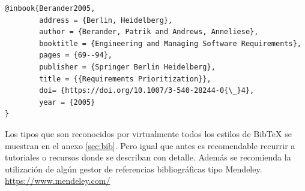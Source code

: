  \begin{verbatim}
@inbook{Berander2005,
        address = {Berlin, Heidelberg},
        author = {Berander, Patrik and Andrews, Anneliese},
        booktitle = {Engineering and Managing Software Requirements},
        pages = {69--94},
        publisher = {Springer Berlin Heidelberg},
        title = {{Requirements Prioritization}},
        doi= {https://doi.org/10.1007/3-540-28244-0{\_}4},
        year = {2005}
} 
 \end{verbatim}
 
 Los tipos que son reconocidos por virtualmente todos los estilos de BibTeX se muestran en el anexo \ref{sec:bib}. Pero igual que antes es recomendable recurrir a tutoriales o recursos donde se describan con detalle. Además se recomienda la utilización de algún gestor de referencias bibliográficas tipo Mendeley. \url{https://www.mendeley.com/}
 
